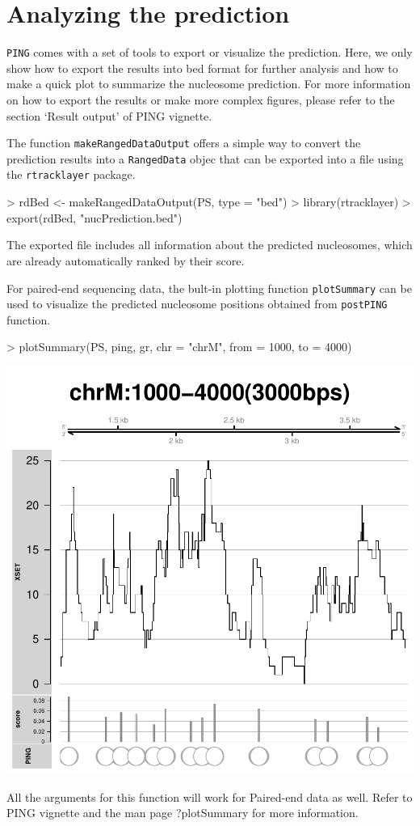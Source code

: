 \documentclass[11pt]{article}
\begin{document}
\section{Analyzing the prediction}
\texttt{PING} comes with a set of tools to export or visualize the prediction.
Here, we only show how to export the results into bed format for further analysis and how to make a quick plot to summarize the nucleosome prediction. For more information on how to export the results or make more complex figures, please refer to the section `Result output' of PING vignette.

The function \texttt{makeRangedDataOutput} offers a simple way to convert the prediction results into a \texttt{RangedData} objec that can be exported into a file using the \texttt{rtracklayer} package. 

\begin{Schunk}
\begin{Sinput}
> rdBed <- makeRangedDataOutput(PS, type = "bed")
> library(rtracklayer)
> export(rdBed, "nucPrediction.bed")
\end{Sinput}
\end{Schunk}
The exported file includes all information about the predicted nucleosomes, which are already automatically ranked by their score. 

\vspace{10pt}
For paired-end sequencing data, the bult-in plotting function \texttt{plotSummary} can be used to visualize the predicted nucleosome positions obtained from \texttt{postPING} function. 


\begin{Schunk}
\begin{Sinput}
> plotSummary(PS, ping, gr, chr = "chrM", from = 1000, to = 4000)
\end{Sinput}
\end{Schunk}
\includegraphics{PING-PE-plotSummary-PE}

All the arguments for this function will work for Paired-end data as well. Refer to PING vignette and  the man page ?plotSummary for more information.
\end{document}
